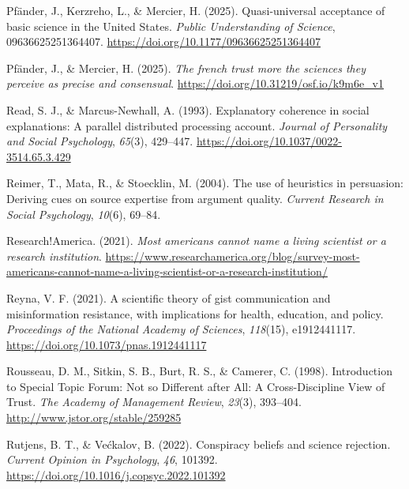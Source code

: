\documentclass[
  jou,
  floatsintext,
  longtable,
  nolmodern,
  notxfonts,
  notimes,
  colorlinks=true,linkcolor=blue,citecolor=blue,urlcolor=blue]{apa7}
\newlength{\cslhangindent}
\newenvironment{CSLReferences}[2] %
 {\begin{list}{}{%
  \setlength{\itemindent}{0pt}
  \setlength{\leftmargin}{0pt}
  \setlength{\parsep}{0pt}
  \ifodd #1
   \setlength{\leftmargin}{\cslhangindent}
   \setlength{\itemindent}{-1\cslhangindent}
  \fi
  \setlength{\itemsep}{#2\baselineskip}}}
 {\end{list}}
\begin{document}
\begin{CSLReferences}{1}{0}
Pfänder, J., Kerzreho, L., \& Mercier, H. (2025). Quasi-universal
acceptance of basic science in the United States. \emph{Public
Understanding of Science}, 09636625251364407.
\url{https://doi.org/10.1177/09636625251364407}

Pfänder, J., \& Mercier, H. (2025). \emph{The french trust more the
sciences they perceive as precise and consensual}.
\url{https://doi.org/10.31219/osf.io/k9m6e_v1}

Read, S. J., \& Marcus-Newhall, A. (1993). Explanatory coherence in
social explanations: A parallel distributed processing account.
\emph{Journal of Personality and Social Psychology}, \emph{65}(3),
429--447. \url{https://doi.org/10.1037/0022-3514.65.3.429}

Reimer, T., Mata, R., \& Stoecklin, M. (2004). The use of heuristics in
persuasion: Deriving cues on source expertise from argument quality.
\emph{Current Research in Social Psychology}, \emph{10}(6), 69--84.

Research!America. (2021). \emph{Most americans cannot name a living
scientist or a research institution}.
\url{https://www.researchamerica.org/blog/survey-most-americans-cannot-name-a-living-scientist-or-a-research-institution/}

Reyna, V. F. (2021). A scientific theory of gist communication and
misinformation resistance, with implications for health, education, and
policy. \emph{Proceedings of the National Academy of Sciences},
\emph{118}(15), e1912441117.
\url{https://doi.org/10.1073/pnas.1912441117}

Rousseau, D. M., Sitkin, S. B., Burt, R. S., \& Camerer, C. (1998).
Introduction to Special Topic Forum: Not so Different after All: A
Cross-Discipline View of Trust. \emph{The Academy of Management Review},
\emph{23}(3), 393--404. \url{http://www.jstor.org/stable/259285}

Rutjens, B. T., \& Većkalov, B. (2022). Conspiracy beliefs and science
rejection. \emph{Current Opinion in Psychology}, \emph{46}, 101392.
\url{https://doi.org/10.1016/j.copsyc.2022.101392}


\end{CSLReferences}
\end{document}
